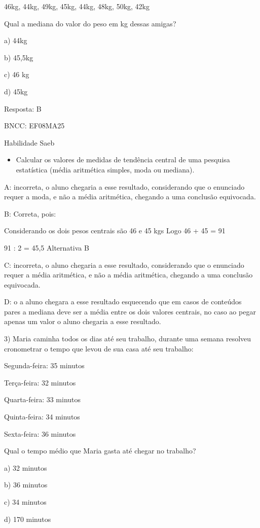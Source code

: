 {46kg, 44kg, 49kg, 45kg, 44kg, 48kg, 50kg, 42kg

Qual a mediana do valor do peso em kg dessas amigas?

a) 44kg

b) 45,5kg

c) 46 kg

d) 45kg

Resposta: B

BNCC: EF08MA25

Habilidade Saeb

\begin{itemize}
\tightlist
\item
  Calcular os valores de medidas de tendência central de uma pesquisa
  estatística (média aritmética simples, moda ou mediana).
\end{itemize}

A: incorreta, o aluno chegaria a esse resultado, considerando que o
enunciado requer a moda, e não a média aritmética, chegando a uma
conclusão equivocada.

B: Correta, pois:

Considerando os dois pesos centrais são 46 e 45 kgs Logo 46 + 45 = 91

91 : 2 = 45,5 Alternativa B

C: incorreta, o aluno chegaria a esse resultado, considerando que o
enunciado requer a média aritmética, e não a média aritmética, chegando
a uma conclusão equivocada.

D: o a aluno chegara a esse resultado esquecendo que em casos de
conteúdos pares a mediana deve ser a média entre os dois valores
centrais, no caso ao pegar apenas um valor o aluno chegaria a esse
resultado.

3) Maria caminha todos os dias até seu trabalho, durante uma semana
resolveu cronometrar o tempo que levou de sua casa até seu trabalho:

Segunda-feira: 35 minutos

Terça-feira: 32 minutos

Quarta-feira: 33 minutos

Quinta-feira: 34 minutos

Sexta-feira: 36 minutos

Qual o tempo médio que Maria gasta até chegar no trabalho?

a) 32 minutos

b) 36 minutos

c) 34 minutos

d) 170 minutos

}
